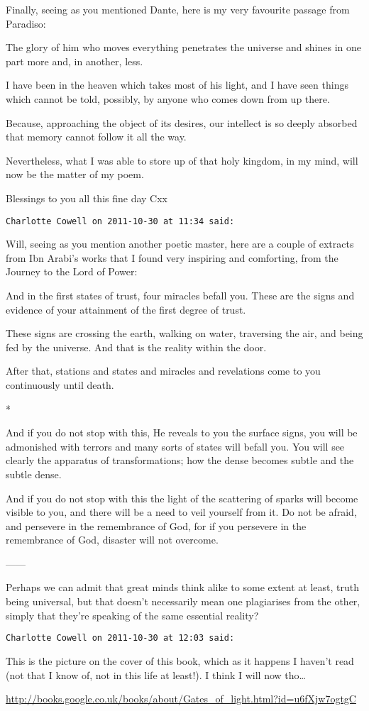 \begin{footnotesize}
\begin{sffamily}
Finally, seeing as you mentioned Dante, here is my very favourite passage from Paradiso:

The glory of him who moves everything penetrates the universe and shines in one part more and, in another, less.

I have been in the heaven which takes most of his light, and I have seen things which cannot be told, possibly, by anyone who comes down from up there.

Because, approaching the object of its desires, our intellect is so deeply absorbed that memory cannot follow it all the way.

Nevertheless, what I was able to store up of that holy kingdom, in my mind, will now be the matter of my poem.

Blessings to you all this fine day Cxx


\hfill

\texttt{Charlotte Cowell on 2011-10-30 at 11:34 said:}

Will, seeing as you mention another poetic master, here are a couple of extracts from Ibn Arabi's works that I found very inspiring and comforting, from the Journey to the Lord of Power:

And in the first states of trust, four miracles befall you. These are the signs and evidence of your attainment of the first degree of trust.

These signs are crossing the earth, walking on water, traversing the air, and being fed by the universe. And that is the reality within the door.

After that, stations and states and miracles and revelations come to you continuously until death.

*

And if you do not stop with this, He reveals to you the surface signs, you will be admonished with terrors and many sorts of states will befall you. You will see clearly the apparatus of transformations; how the dense becomes subtle and the subtle dense.

And if you do not stop with this the light of the scattering of sparks will become visible to you, and there will be a need to veil yourself from it. Do not be afraid, and persevere in the remembrance of God, for if you persevere in the remembrance of God, disaster will not overcome.

——

Perhaps we can admit that great minds think alike to some extent at least, truth being universal, but that doesn't necessarily mean one plagiarises from the other, simply that they're speaking of the same essential reality?


\hfill

\texttt{Charlotte Cowell on 2011-10-30 at 12:03 said:}

This is the picture on the cover of this book, which as it happens I haven't read (not that I know of, not in this life at least!). I think I will now tho…

\url{http://books.google.co.uk/books/about/Gates\_of\_light.html?id=u6fXjw7ogtgC}

\end{sffamily}\end{footnotesize}
